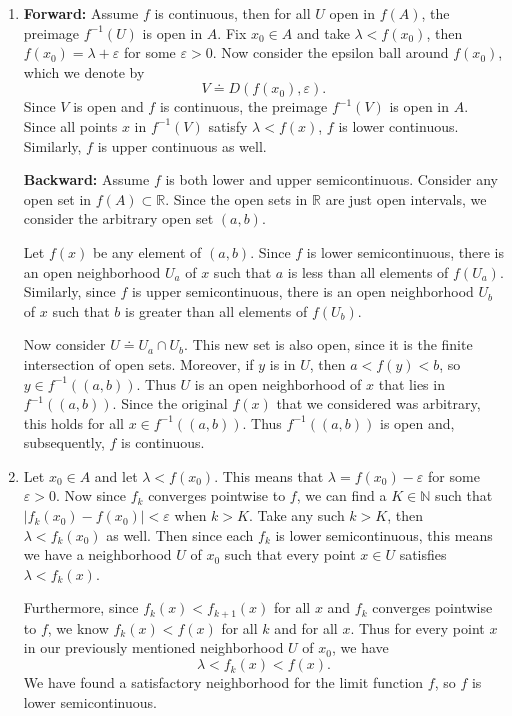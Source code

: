\documentclass[10pt]{amsart}
\begin{document}
\begin{enumerate}
	\item \textbf{Forward:} Assume $f$ is continuous, then for all $U$ open in $f(A)$, the preimage $f^{-1}(U)$ is open in $A$. Fix $x_0 \in A$ and take $\lambda < f(x_0)$, then $f(x_0)=\lambda + \varepsilon$ for some $\varepsilon > 0$. Now consider the epsilon ball around $f(x_0)$, which we denote by
		\[
			V \doteq D(f(x_0), \varepsilon).
		\] Since $V$ is open and $f$ is continuous, the preimage $f^{-1}(V)$ is open in $A$. Since all points $x$ in $f^{-1}(V)$ satisfy $\lambda < f(x)$, $f$ is lower continuous. Similarly, $f$ is upper continuous as well.

		\textbf{Backward:} Assume $f$ is both lower and upper semicontinuous. Consider any open set in $f(A) \subset \mathbb{R}$. Since the open sets in $\mathbb{R}$ are just open intervals, we consider the arbitrary open set $(a,b)$.

		Let $f(x)$ be any element of $(a,b)$. Since $f$ is lower semicontinuous, there is an open neighborhood $U_a$ of $x$ such that $a$ is less than all elements of $f(U_a)$. Similarly, since $f$ is upper semicontinuous, there is an open neighborhood $U_b$ of $x$ such that $b$ is greater than all elements of $f(U_b)$.

		Now consider $U \doteq U_a \cap U_b$. This new set is also open, since it is the finite intersection of open sets. Moreover, if $y$ is in $U$, then $a < f(y) < b$, so $y \in f^{-1}( (a,b))$. Thus $U$ is an open neighborhood of $x$ that lies in $f^{-1}( (a,b))$. Since the original $f(x)$ that we considered was arbitrary, this holds for all $x \in f^{-1}( (a,b))$. Thus $f^{-1}( (a,b))$ is open and, subsequently, $f$ is continuous.

	\item Let $x_0\in A$ and let $\lambda < f(x_0)$. This means that $\lambda=f(x_0)-\varepsilon$ for some $\varepsilon>0$. Now since $f_k$ converges pointwise to $f$, we can find a $K \in \mathbb{N}$ such that $|f_k(x_0)-f(x_0)| < \varepsilon$ when $k > K$. Take any such $k > K$, then $\lambda < f_k(x_0)$ as well. Then since each $f_k$ is lower semicontinuous, this means we have a neighborhood $U$ of $x_0$ such that every point $x \in U$ satisfies $\lambda < f_k(x)$.

		Furthermore, since $f_k(x) < f_{k+1}(x)$ for all $x$ and $f_k$ converges pointwise to $f$, we know $f_k(x) < f(x)$ for all $k$ and for all $x$. Thus for every point $x$ in our previously mentioned neighborhood $U$ of $x_0$, we have
		\[
			\lambda < f_k(x) < f(x).
		\] We have found a satisfactory neighborhood for the limit function $f$, so $f$ is lower semicontinuous.


\end{enumerate}
\end{document}
